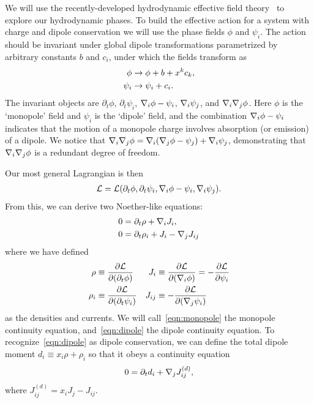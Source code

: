 We will use the recently-developed hydrodynamic effective field theory~\cite{Crossley2017Effective, Haehl2016Fluid, Jensen2018Dissipative, Glorioso2017Effective, Liu2018Lectures} to explore our hydrodynamic phases.
To build the effective action for a system with charge and dipole conservation we will use the phase fields $\phi$ and $\psi_i$. The action should be invariant under global dipole transformations parametrized by arbitrary constants $b$ and $c_i$, under which the fields transform as 
\begin{align}
\phi &\rightarrow \phi + b + x^k c_k,\nonumber\\
\psi_i &\rightarrow \psi_i + c_i.
\end{align}
The invariant objects are $\partial_t\phi$, $\partial_t\psi_i$, $\nabla_i\phi-\psi_i$, $\nabla_i\psi_j$, and $\nabla_i\nabla_j\phi$. Here $\phi$ is the `monopole' field and $\psi_i$ is the `dipole' field, and the combination $\nabla_i\phi-\psi_i$ indicates that the motion of a monopole charge involves absorption (or emission) of a dipole. We notice that $\nabla_i\nabla_j\phi=\nabla_i(\nabla_j\phi-\psi_j)+\nabla_i\psi_j$, demonstrating that $\nabla_i\nabla_j \phi$ is a redundant degree of freedom. 

Our most general Lagrangian is then
\begin{align}
\mathcal{L} = \mathcal{L}(\partial_t\phi, \partial_t\psi_i, \nabla_i\phi-\psi_i, \nabla_i\psi_j). \label{eqn:singlecontour}
\end{align}
From this, we can derive two Noether-like equations:
\begin{align}
0 &= \partial_t \rho + \nabla_i J_i, \label{eqn:monopole}\\
0 &= \partial_t \rho_i + J_i - \nabla_j J_{ij} \label{eqn:dipole}
\end{align}  
where we have defined
\begin{align}
\rho &\equiv \frac{\partial \mathcal{L}}{\partial (\partial_t \phi)} & J_i &\equiv \frac{\partial \mathcal{L}}{\partial(\nabla_i\phi)} = -\frac{\partial \mathcal{L}}{\partial \psi_i}\nonumber\\
\rho_i &\equiv \frac{\partial \mathcal{L} }{\partial (\partial_t \psi_i)} & J_{ij} &\equiv -\frac{\partial \mathcal{L}}{\partial(\nabla_j \psi_i)}
\end{align}
as the densities and currents. We will call~\eqref{eqn:monopole} the monopole continuity equation, and~\eqref{eqn:dipole} the dipole continuity equation.
To recognize~\eqref{eqn:dipole} as dipole conservation, we can define the total dipole moment $d_i \equiv x_i\rho + \rho_i$ so that it obeys a continuity equation
\begin{align}
0 = \partial_t d_i + \nabla_j J_{ij}^{(d)},
\end{align}
where $J_{ij}^{(d)} = x_iJ_j - J_{ij}$.

